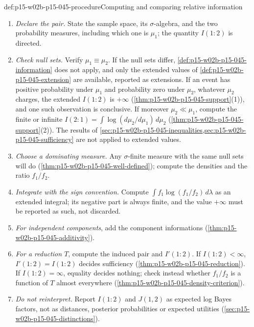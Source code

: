 \begin{hbmethod}{def:p15-w02b-p15-045-procedure}{Computing and comparing relative information}
\begin{enumerate}
\item \emph{Declare the pair.} State the sample space, its
\(\sigma\)-algebra, and the two probability measures, including which
one is \(\mu_1\); the quantity \(I(1:2)\) is directed.
\item \emph{Check null sets.} Verify \(\mu_1\equiv\mu_2\). If the null
sets differ, \cref{def:p15-w02b-p15-045-information} does not apply, and
only the extended values of \cref{def:p15-w02b-p15-045-extension} are
available, reported as extensions. If an event has positive probability
under \(\mu_1\) and probability zero under \(\mu_2\), whatever \(\mu_2\)
charges, the extended \(I(1:2)\) is \(+\infty\)
(\cref{thm:p15-w02b-p15-045-support}(1)), and one such observation is
conclusive. If moreover \(\mu_2\ll\mu_1\), compute the finite or
infinite \(I(2:1)=\int\log(d\mu_2/d\mu_1)\,d\mu_2\)
(\cref{thm:p15-w02b-p15-045-support}(2)). The results of
\cref{sec:p15-w02b-p15-045-inequalities,sec:p15-w02b-p15-045-sufficiency}
are not applied to extended values.
\item \emph{Choose a dominating measure.} Any \(\sigma\)-finite measure
with the same null sets will do
(\cref{thm:p15-w02b-p15-045-well-defined}); compute the densities and
the ratio \(f_1/f_2\).
\item \emph{Integrate with the sign convention.} Compute
\(\int f_1\log(f_1/f_2)\,d\lambda\) as an extended integral; its
negative part is always finite, and the value \(+\infty\) must be
reported as such, not discarded.
\item \emph{For independent components}, add the component informations
(\cref{thm:p15-w02b-p15-045-additivity}).
\item \emph{For a reduction \(T\)}, compute the induced pair and
\(I'(1:2)\). If \(I(1:2)<\infty\), \(I'(1:2)=I(1:2)\) decides
sufficiency (\cref{thm:p15-w02b-p15-045-reduction}). If
\(I(1:2)=\infty\), equality decides nothing; check instead whether
\(f_1/f_2\) is a function of \(T\) almost everywhere
(\cref{thm:p15-w02b-p15-045-density-criterion}).
\item \emph{Do not reinterpret.} Report \(I(1:2)\) and \(J(1,2)\) as
expected log Bayes factors, not as distances, posterior probabilities
or expected utilities (\cref{sec:p15-w02b-p15-045-distinctions}).
\end{enumerate}
\end{hbmethod}

